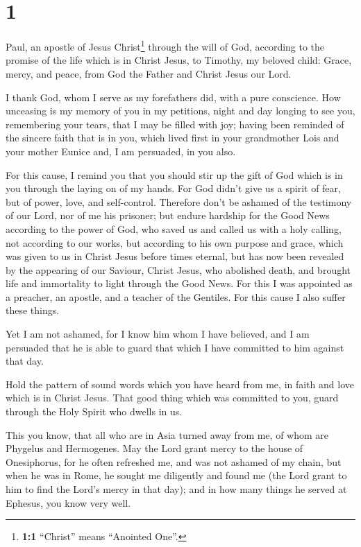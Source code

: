 \hypertarget{section}{%
\section{1}\label{section}}

 Paul, an apostle of Jesus Christ\footnote{\textbf{1:1}
  ``Christ'' means ``Anointed One''.} through the will of God, according
to the promise of the life which is in Christ Jesus,  to
Timothy, my beloved child: Grace, mercy, and peace, from God the Father
and Christ Jesus our Lord.

 I thank God, whom I serve as my forefathers did, with a
pure conscience. How unceasing is my memory of you in my petitions,
night and day  longing to see you, remembering your tears,
that I may be filled with joy;  having been reminded of
the sincere faith that is in you, which lived first in your grandmother
Lois and your mother Eunice and, I am persuaded, in you also.

 For this cause, I remind you that you should stir up the
gift of God which is in you through the laying on of my hands.
 For God didn't give us a spirit of fear, but of power,
love, and self-control.  Therefore don't be ashamed of the
testimony of our Lord, nor of me his prisoner; but endure hardship for
the Good News according to the power of God,  who saved us
and called us with a holy calling, not according to our works, but
according to his own purpose and grace, which was given to us in Christ
Jesus before times eternal,  but has now been revealed by
the appearing of our Saviour, Christ Jesus, who abolished death, and
brought life and immortality to light through the Good News.
 For this I was appointed as a preacher, an apostle, and
a teacher of the Gentiles.  For this cause I also suffer
these things.

Yet I am not ashamed, for I know him whom I have believed, and I am
persuaded that he is able to guard that which I have committed to him
against that day.

 Hold the pattern of sound words which you have heard
from me, in faith and love which is in Christ Jesus. 
That good thing which was committed to you, guard through the Holy
Spirit who dwells in us.

 This you know, that all who are in Asia turned away from
me, of whom are Phygelus and Hermogenes.  May the Lord
grant mercy to the house of Onesiphorus, for he often refreshed me, and
was not ashamed of my chain,  but when he was in Rome, he
sought me diligently and found me  (the Lord grant to him
to find the Lord's mercy in that day); and in how many things he served
at Ephesus, you know very well.

